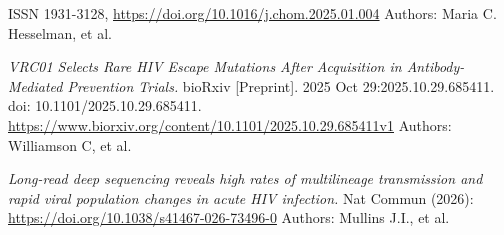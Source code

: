 \begin{description}
\begin{description}
\begin{description}
	ISSN 1931-3128, 
         \url{https://doi.org/10.1016/j.chom.2025.01.004}
         Authors:  Maria C. Hesselman,  et al. \newline
\item[2025:]
	{\it VRC01 Selects Rare HIV Escape Mutations After Acquisition in Antibody-Mediated Prevention Trials.}
	bioRxiv [Preprint]. 2025 Oct 29:2025.10.29.685411. doi: 10.1101/2025.10.29.685411. 
	\url{https://www.biorxiv.org/content/10.1101/2025.10.29.685411v1}
	Authors: Williamson C, et al.  \newline
\item[2026:]
         {\it Long-read deep sequencing reveals high rates of multilineage transmission 
         and rapid viral population changes in acute HIV infection.} 
         Nat Commun (2026): 
         \url{https://doi.org/10.1038/s41467-026-73496-0}
         Authors:  Mullins J.I., et al. \newline

\end{description}
\end{description}
\end{description}
\label{f0}

